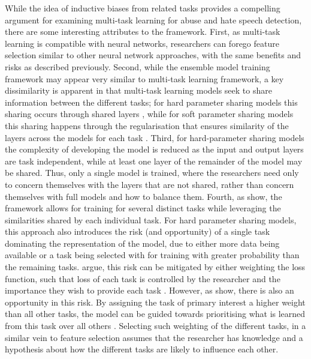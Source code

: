 While the idea of inductive biases from related tasks provides a compelling argument for examining multi-task learning for abuse and hate speech detection, there are some interesting attributes to the framework. First, as multi-task learning is compatible with neural networks, researchers can forego feature selection similar to other neural network approaches, with the same benefits and risks as described previously.
Second, while the ensemble model training framework may appear very similar to multi-task learning framework, a key dissimilarity is apparent in that multi-task learning models seek to share information between the different tasks; for hard parameter sharing models this sharing occurs through shared layers \cite{CITE: Hard parameter sharing paper}, while for soft parameter sharing models this sharing happens through the regularisation that ensures similarity of the layers across the models for each task \cite{CITE: Soft parameter sharing paper}.
Third, for hard-parameter sharing models the complexity of developing the model is reduced as the input and output layers are task independent, while at least one layer of the remainder of the model may be shared. Thus, only a single model is trained, where the researchers need only to concern themselves with the layers that are not shared, rather than concern themselves with full models and how to balance them.
Fourth, as \cite{Caruana:1997} show, the framework allows for training for several distinct tasks while leveraging the similarities shared by each individual task.
For hard parameter sharing models, this approach also introduces the risk (and opportunity) of a single task dominating the representation of the model, due to either more data being available or a task being selected with for training with greater probability than the remaining tasks. \citet{CITE: Weighting paper} argue, this risk can be mitigated by either weighting the loss function, such that loss of each task is controlled by the researcher and the importance they wish to provide each task \cite{CITE: Weighting paper}. However, as \cite{CITE: Weighting/aux task paper} show, there is also an opportunity in this risk. By assigning the task of primary interest a higher weight than all other tasks, the model can be guided towards prioritising what is learned from this task over all others \cite{CITE: Paper with auxiliary tasks}. Selecting such weighting of the different tasks, in a similar vein to feature selection assumes that the researcher has knowledge and a hypothesis about how the different tasks are likely to influence each other.
